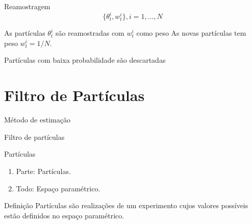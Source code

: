 \documentclass{beamer}
\begin{document}
\begin{frame}{Reamostragem}
$$
\{\theta_t^i,w_t^i\},  i=1,...,N
$$

\pause
\vspace{0.5cm} 
As partículas $\theta^i_t$ são reamostradas com $w^i_t$ como peso
\pause
\vspace{0.5cm} 
As novas partículas tem peso $w^i_t = 1/N$. 
\vspace{0.5cm} 

\pause
Partículas com baixa probabilidade são descartadas

\end{frame}




\section{Filtro de Partículas}

\begin{frame}{Método de estimação}
    \begin{block}{}
      \Huge  Filtro de partículas
    \end{block}

\end{frame}



\begin{frame}{Partículas}
\noindent


    \begin{enumerate}
      \item<2-| alert@2> Parte: Partículas.
      \item<3-| alert@3> Todo: Espaço paramétrico.
    \end{enumerate}
    
\pause
\pause
\pause
  \begin{block}{Definição}
  {\large Partículas são realizações de um experimento cujos valores possíveis estão definidos no espaço paramétrico.}
\end{block}


 
\end{frame}
\end{document}
